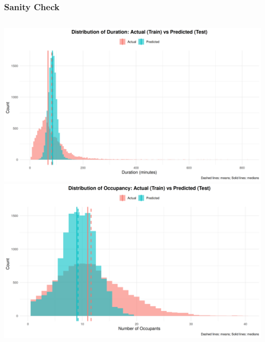 \documentclass{beamer}
\begin{document}
\begin{frame}
\frametitle{Sanity Check}
    \vspace{-1em}
    \begin{center}
        \begin{columns}[T] %
            \hspace*{-1em}
            \centering
            \includegraphics[width=\textwidth, height=0.53\textheight]{images/eval/duration_distribution.png}
            \hspace*{-1em}
            \centering
            \includegraphics[width=\textwidth, height=0.53\textheight]{images/eval/occupancy_distribution.png}
        \end{columns}
        
        \vspace{-0.5em} %
        

\end{center}
\end{frame}
\end{document}
